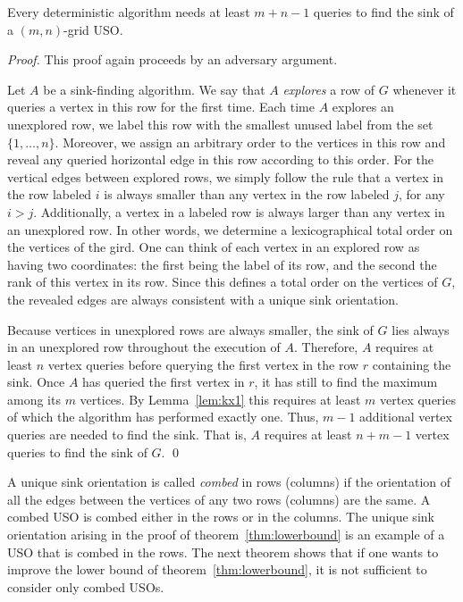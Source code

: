 \documentclass[runningheads,a4paper]{llncs}
\begin{document}
\begin{theorem} \label{thm:lowerbound}
Every deterministic algorithm needs at least $m+n-1$ queries to find the sink of a $(m,n)$-grid USO. 
\end{theorem}
\begin{proof}
    This proof again proceeds by an adversary argument.

Let $A$ be a sink-finding algorithm. We say that $A$ \emph{explores} a row of $G$ whenever it queries a vertex in this row for the first time.
Each time $A$ explores an unexplored row, we label this row with the smallest unused label from the set $\{1, \ldots, n\}$. Moreover, we assign an arbitrary order to the vertices in this row and reveal any queried horizontal edge in this row according to this order. For the vertical edges between explored rows, we simply follow the rule that a vertex in the row labeled $i$ is always smaller than any vertex in the row labeled $j$, for any $i > j$. Additionally, a vertex in a labeled row is always larger than any vertex in an unexplored row. In other words, we determine a lexicographical total order on the vertices of the gird. One can think of each vertex in an explored row as having two coordinates: the first being the label of its row, and the second the rank of this vertex in its row.
Since this defines a total order on the vertices of $G$, the revealed edges are always consistent with a unique sink orientation.

Because vertices in unexplored rows are always smaller, the sink of $G$ lies always in an unexplored row throughout the execution of $A$. Therefore, $A$ requires at least $n$ vertex queries before querying the first vertex in the row $r$ containing the sink. Once $A$ has queried the first vertex in $r$, it has still to find the maximum among its $m$ vertices. 
By Lemma~\ref{lem:kx1} this requires at least $m$ vertex queries of which the algorithm has performed exactly one. Thus, $m-1$ additional vertex queries are needed to find the sink. That is, $A$ requires at least $n+m-1$ vertex queries to find the sink of $G$. \qed
\end{proof}

A unique sink orientation is called \emph{combed} in rows (columns) if the orientation of all the edges between the vertices of any two rows (columns) are the same. 
A combed USO is combed either in the rows or in the columns. The unique sink orientation arising in the proof of theorem~\ref{thm:lowerbound} is an example of a USO that is combed in the rows.
The next theorem shows that if one wants to improve the lower bound of theorem~\ref{thm:lowerbound}, it is not sufficient to consider only combed USOs.
\end{document}
